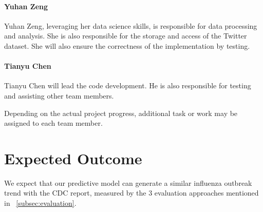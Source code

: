 \documentclass[12pt, oneside]{article}
\begin{document}
\paragraph{Yuhan Zeng}
Yuhan Zeng, leveraging her data science skills, is responsible for data processing and analysis. She is also responsible for the storage and access of the Twitter dataset.
She will also ensure the correctness of the implementation by testing.

\paragraph{Tianyu Chen}
Tianyu Chen will lead the code development. He is also responsible for testing and assisting other team members.

Depending on the actual project progress, additional task or work may be assigned to each team member.

\section{Expected Outcome}

We expect that our predictive model can generate a similar influenza outbreak trend with the CDC report, measured by the 3 evaluation approaches
mentioned in ~\ref{subsec:evaluation}.




\end{document}
